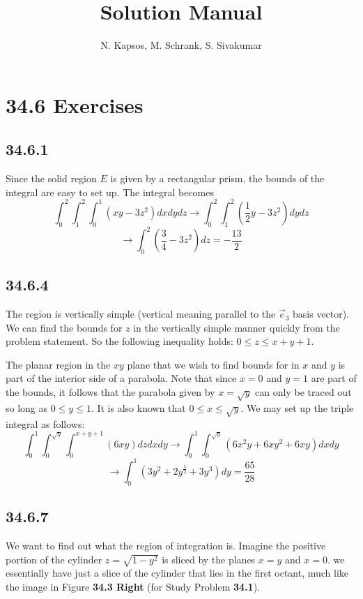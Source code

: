 \documentclass{article}
\title{Solution Manual}
\author{N. Kapsos, M. Schrank, S. Sivakumar}
\date{}
\begin{document}
\maketitle
\setcounter{secnumdepth}{0}

\section{34.6 Exercises}

\subsection{34.6.1}

Since the solid region $E$ is given by a rectangular prism, the bounds of the integral are easy to set up. The integral becomes $$\int_{0}^{2}\int_{1}^{2}\int_{0}^{1} (xy-3z^2) dxdydz \to \int_{0}^{2}\int_{1}^{2} \left(\frac{1}{2}y-3z^2\right) dydz$$
$$\to \int_{0}^{2} \left(\frac{3}{4}-3z^2\right) dz = -\frac{13}{2}$$

\subsection{34.6.4}

The region is vertically simple (vertical meaning parallel to the $\vec{e}_3$ basis vector). We can find the bounds for $z$ in the vertically simple manner quickly from the problem statement. So the following inequality holds: $0 \leq z \leq x + y + 1$. 

The planar region in the $xy$ plane that we wish to find bounds for in $x$ and $y$ is part of the interior side of a parabola. Note that since $x=0$ and $y=1$ are part of the bounds, it follows that the parabola given by $x = \sqrt{y}$ can only be traced out so long as $0 \leq y \leq 1$. It is also known that $0\leq x \leq \sqrt{y}$. We may set up the triple integral as follows:
$$\int_{0}^{1}\int_{0}^{\sqrt{y}}\int_{0}^{x+y+1}\left(6xy\right) dzdxdy \to \int_{0}^{1}\int_{0}^{\sqrt{y}} (6x^2y + 6xy^2 + 6xy)dxdy$$
$$\to \int_{0}^{1}\left(3 y^2 + 2 y^{\frac{5}{2}} + 3 y^3\right)dy = \frac{65}{28}$$

\subsection{34.6.7}

We want to find out what the region of integration is. Imagine the positive portion of the cylinder $z = \sqrt{1-y^2}$ is sliced by the planes $x = y$ and $x = 0$. we essentially have just a slice of the cylinder that lies in the first octant, much like the image in Figure \textbf{34.3 Right} (for Study Problem \textbf{34.1}).
\end{document}
